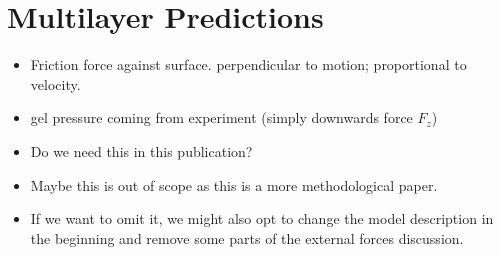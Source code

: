 \documentclass{article}
\begin{document}
\section{Multilayer Predictions}

\begin{itemize}
    \item Friction force against surface. perpendicular to motion; proportional to velocity.
    \item gel pressure coming from experiment (simply downwards force $F_z$)
\end{itemize}

\begin{itemize}
    \item Do we need this in this publication?
    \item Maybe this is out of scope as this is a more methodological paper.
    \item If we want to omit it, we might also opt to change the model description in the beginning
        and remove some parts of the external forces discussion.
\end{itemize}
\end{document}
